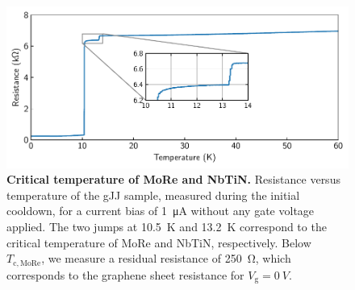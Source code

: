 \begin{figure}[]
	\centering
	\includegraphics[width=.7\linewidth]{chapter-gJJ/figs/si_cooldown_tc}
	\caption{{\bf Critical temperature of MoRe and NbTiN.}
		Resistance versus temperature of the gJJ sample, measured during the initial cooldown, for a current bias of \SI{1}{\micro A} without any gate voltage applied.
		The two jumps at \SI{10.5}{K} and \SI{13.2}{K} correspond to the critical temperature of MoRe and NbTiN, respectively.
		Below $T_\mathrm{c,MoRe}$, we measure a residual resistance of \SI{250}{\ohm}, which corresponds to the graphene sheet resistance for $V_\text{g}=\SI{0}{V}$.}
	\label{fig:critical_temp}
\end{figure}


